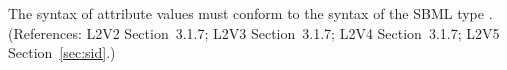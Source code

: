 The syntax of  attribute values must conform to the syntax of the
SBML type .  (References: L2V2 Section~3.1.7;
L2V3 Section~3.1.7; L2V4 Section~3.1.7; L2V5 Section~\ref{sec:sid}.)
